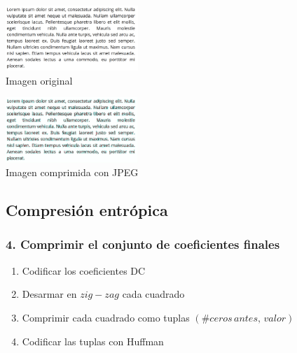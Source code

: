 \documentclass{beamer}
\begin{document}
\begin{frame}
    \begin{minipage}[t]{0.4\linewidth}
        \begin{center}
            {
                \includegraphics[width=5cm]{fig/text.png}\\
                Imagen original
            }
        \end{center}
    \end{minipage}
    \hfill
    \begin{minipage}[t]{0.4\linewidth}
        \begin{center}
            {
                \includegraphics[width=5cm]{fig/text_artifacts.png}\\
                Imagen comprimida con JPEG
            }
        \end{center}
    \end{minipage}
\end{frame}

\subsection{Compresión entrópica}
\begin{frame}
    \frametitle{4. Comprimir el conjunto de coeficientes finales}
    \begin{enumerate}
        \item Codificar los coeficientes DC
        \item Desarmar en $zig-zag$ cada cuadrado
        \item Comprimir cada cuadrado como tuplas $(\# ceros \, antes, \, valor)$
        \item Codificar las tuplas con Huffman
    \end{enumerate}
\end{frame}
\end{document}
